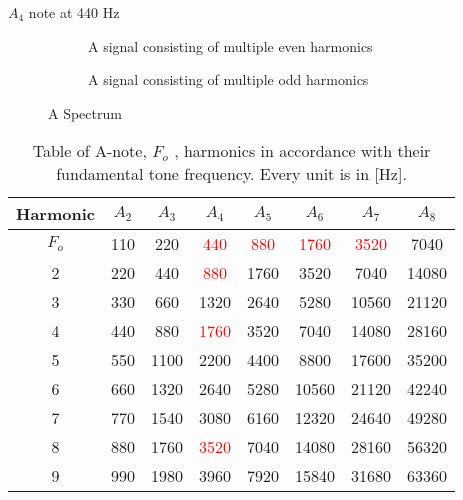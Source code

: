$A_4$ note at 440 Hz

\begin{figure}[H]
\centering
\begin{subfigure}[t]{0.47\textwidth}
	
	\caption{A signal consisting of multiple even harmonics}
	\label{fig:EvenTHD}
\end{subfigure}
\hspace{6mm} 
\begin{subfigure}[t]{0.47\textwidth}
	
	\caption{A signal consisting of multiple odd harmonics}
	\label{fig:OddTHD}
\end{subfigure}
\caption{A Spectrum}
\end{figure}


\begin{table}[H]
\centering
{}
\begin{tabular}{S[table-format=1]ccccccc} \toprule
    {Harmonic} & {$A_2$} & {$A_3$} & {$A_4$} & {$A_5$} & {$A_6$} & {$A_7$} & {$A_8$} \\ \midrule 
    $F_o$  & 110  & 220  & \textcolor{red}{440}   & \textcolor{red}{880}  & \textcolor{red}{1760}  & \textcolor{red}{3520}   & 7040   \\       & 220  & 440  & \textcolor{red}{880}   & 1760 & 3520   & 7040   & 14080  \\ 
    3      & 330  & 660  & 1320  & 2640 & 5280   & 10560  & 21120  \\
    4      & 440  & 880  & \textcolor{red}{1760}  & 3520 & 7040   & 14080  & 28160  \\ 
    5      & 550  & 1100 & 2200  & 4400 & 8800   & 17600  & 35200  \\       & 660  & 1320 & 2640  & 5280 & 10560  & 21120  & 42240  \\
    7      & 770  & 1540 & 3080  & 6160 & 12320  & 24640  & 49280  \\
    8      & 880  & 1760 & \textcolor{red}{3520}  & 7040 & 14080  & 28160  & 56320  \\ 
    9      & 990  & 1980 & 3960  & 7920 & 15840  & 31680  & 63360  \\ \bottomrule
\end{tabular}
\caption{Table of A-note, $F_o$ , harmonics in accordance with their fundamental tone frequency. Every unit is in [Hz].\citep{sou:NoteA}}
\end{table}


